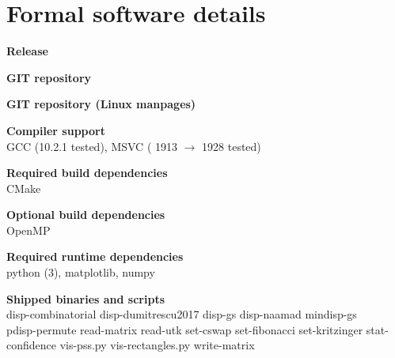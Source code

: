 \section*{Formal software details}
  \textbf{Release}\\
  \dptkversion
  
  \textbf{GIT repository}\\
  
  \textbf{GIT repository (Linux manpages)}\\
  
  \textbf{Compiler support}\\
  GCC (10.2.1 tested), MSVC ( 1913 $\rightarrow$ 1928 tested)

  \textbf{Required build dependencies}\\
  CMake
    
  \textbf{Optional build dependencies}\\
  OpenMP
  
  \textbf{Required runtime dependencies}\\
  python (3), matplotlib, numpy
  
  \textbf{Shipped binaries and scripts}\\
  disp-combinatorial
disp-dumitrescu2017
disp-gs
disp-naamad
mindisp-gs\\
pdisp-permute
read-matrix
read-utk
set-cswap
set-fibonacci
set-kritzinger
stat-confidence
vis-pss.py
vis-rectangles.py
write-matrix
\clearpage
